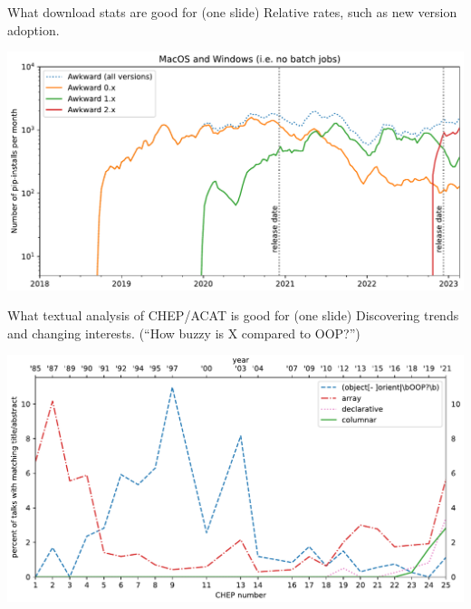 \documentclass[aspectratio=169]{beamer}
\begin{document}
\begin{frame}{What download stats are good for (one slide)}
\vspace{0.35 cm}
Relative rates, such as new version adoption.

\begin{center}
\includegraphics[width=0.9\linewidth]{PLOTS/pip-macwin-awkward-log.pdf}
\end{center}
\end{frame}

\begin{frame}{What textual analysis of CHEP/ACAT is good for (one slide)}
\vspace{0.35 cm}
Discovering trends and changing interests. (``How buzzy is X compared to OOP?'')

\begin{center}
\includegraphics[width=0.9\linewidth]{PLOTS/chep-papers-paradigm.pdf}
\end{center}
\end{frame}
\end{document}
